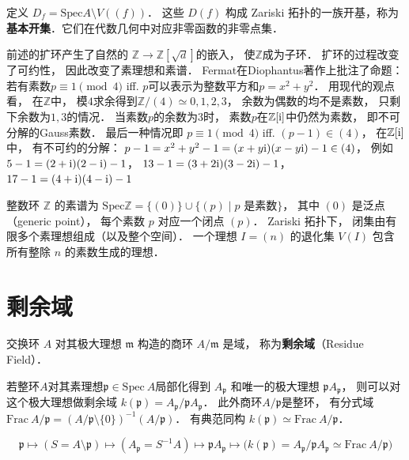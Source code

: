 定义 $D_f = \text{Spec} A \setminus V((f))$．
这些 \(D(f)\) 构成 Zariski 拓扑的一族开基，称为\textbf{基本开集}．它们在代数几何中对应非零函数的非零点集．


前述的扩环产生了自然的
$\mathbb Z \to \mathbb Z[\sqrt d]$的嵌入，
使$\mathbb Z$成为子环．
扩环的过程改变了可约性，
因此改变了素理想和素谱．
Fermat在Diophantus著作上批注了命题：
若有素数$p \equiv 1 \pmod{4}$ iff.
$p$可以表示为整数平方和$p = x^2 + y^2$．
用现代的观点看，
在$\mathbb Z$中，
模$4$求余得到$\mathbb Z/(4) \simeq {0,1,2,3}$，
余数为偶数的均不是素数，
只剩下余数为$1,3$的情况．
当素数$p$的余数为$3$时，
素数$p$在$\mathbb Z[\text i]$中仍然为素数，
即不可分解的Gauss素数．
最后一种情况即
$p \equiv 1 \pmod{4}$ iff. $(p - 1) \in (4)$，
在$\mathbb Z[\text i]$中，
有不可约的分解：
$p - 1 = x^2 + y^2 - 1 = (x + y\text i)(x - y\text i) - 1 \in (4)$，
例如
$5 - 1 = (2 + \text i)(2 - \text i) - 1$，
$13 - 1 = (3 + 2\text i)(3 - 2\text i) - 1$，
$17 - 1 = (4 + \text i)(4 - \text i) - 1$

整数环 \(\mathbb{Z}\) 的素谱为
$\text{Spec} \mathbb Z = \{ (0) \} \cup \{ (p) \mid p \text{ 是素数} \}$，
其中 $(0)$ 是泛点（generic point），
每个素数 $p$ 对应一个闭点 $(p)$．
Zariski 拓扑下，
闭集由有限多个素理想组成（以及整个空间）．
一个理想 $I = (n)$ 的退化集 $V(I)$ 包含所有整除 $n$ 的素数生成的理想．

\section{剩余域}
  
\begin{framed}
\noindent
交换环 $A$ 对其极大理想 $\mathfrak m$ 构造的商环 $A/\mathfrak m$ 是域，
称为\textbf{剩余域}（Residue Field）．
\end{framed}

若整环$A$对其素理想$\mathfrak p\in\text{Spec} \ A$局部化得到 $A_\mathfrak p$ 和唯一的极大理想 $\mathfrak p A_\mathfrak p$，
则可以对这个极大理想做剩余域
$k(\mathfrak p) = A_\mathfrak p/\mathfrak p A_\mathfrak p$．
此外商环$A/\mathfrak p$是整环，
有分式域$\text{Frac} \ A/\mathfrak p = (A/\mathfrak p\setminus \{0\})^{-1}(A/\mathfrak p) $．
有典范同构
$k(\mathfrak p) \simeq \text{Frac} \ A/\mathfrak p$．

\begin{equation}
\mathfrak p 
\mapsto (S = A \setminus \mathfrak p)
\mapsto (A_\mathfrak p = S^{-1} A)
\mapsto \mathfrak pA_\mathfrak p
\mapsto \big( k(\mathfrak p) = A_\mathfrak p/\mathfrak p A_\mathfrak p \simeq \text{Frac} \ A/\mathfrak p \big)
\end{equation}
\label{eq:prime-ideal-local-ring}

